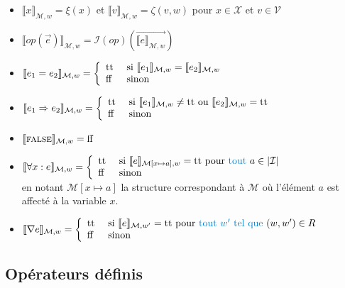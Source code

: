 \documentclass[12pt]{article}
\newcommand{\false}{\textup{ff}}
\newcommand{\true}{\textup{tt}}
\newcommand{\M}{\ensuremath{\mathcal{M}}}
\newcommand{\I}{\ensuremath{\mathcal{I}}}
\newcommand{\FALSE}{\textsc{false}}
\begin{document}
\begin{itemize}
\item
  $\llbracket x \rrbracket_{\M, w} = \xi(x)$ et $\llbracket v \rrbracket_{\M, w} = \zeta(v, w)$ pour $x \in \mathcal{X}$ et $v \in \mathcal{V}$
\item
  $\llbracket op(\vec{e}) \rrbracket_{\M, w} = \I(op)(\vec{\llbracket e \rrbracket_{\M, w}})$
\item
  $\llbracket e_1 = e_2 \rrbracket_{\M, w} = \left \{
\begin{array}{l l}
  \true & \textup{ si } \llbracket e_1 \rrbracket_{\M, w} = \llbracket e_2 \rrbracket_{\M, w} \\
  \false & \textup{ sinon }
\end{array} \right .$
\item
  $\llbracket e_1 \Rightarrow e_2 \rrbracket_{\M, w} = \left \{
\begin{array}{l l}
  \true & \textup{ si } \llbracket e_1 \rrbracket_{\M, w} \neq \true \textup{ ou }
          \llbracket e_2 \rrbracket_{\M, w} = \true \\
  \false & \textup{ sinon }
\end{array} \right .$
\item
  $\llbracket \FALSE \rrbracket_{\M, w} = \false$
\item
  $\llbracket \forall x : e \rrbracket_{\M, w} = \left \{
\begin{array}{l l}
  \true & \textup{ si } \llbracket e \rrbracket_{\M[x \mapsto a], w} = \true \textup{ pour \textcolor{myblue}{tout} } a \in |\I| \\
  \false & \textup{ sinon }
\end{array} \right .$\\
en notant $\M[x \mapsto a]$ la structure correspondant à $\M$ où l'élément $a$ est affecté à la variable $x$.
\item
  $\llbracket \nabla e \rrbracket_{\M, w} = \left \{
\begin{array}{l l}
  \true & \textup{ si } \llbracket e \rrbracket_{\M, w'} = \true \textup{ pour \textcolor{myblue}{tout $w'$ tel que} } (w, w') \in R \\
  \false & \textup{ sinon }
\end{array} \right .$
\end{itemize}

\subsection{Opérateurs définis}
\end{document}
